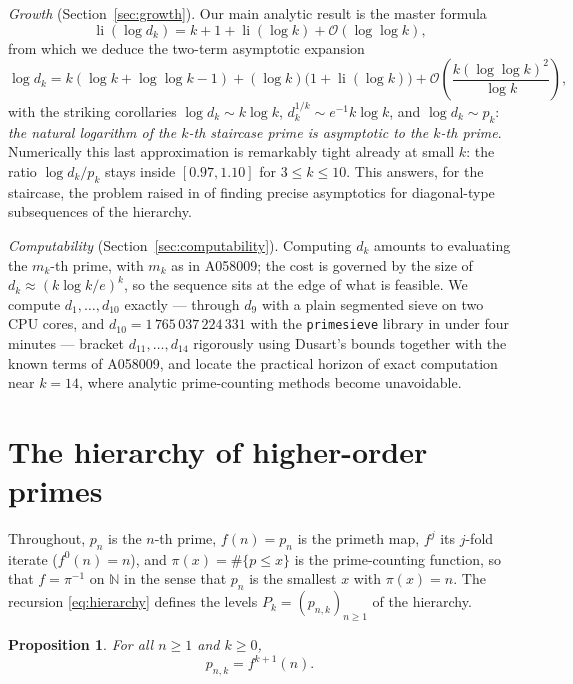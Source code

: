 \documentclass[11pt,a4paper]{article}
\theoremstyle{plain}
\newtheorem{proposition}[theorem]{Proposition}
\theoremstyle{definition}
\newcommand{\N}{\mathbb{N}}
\newcommand{\li}{\operatorname{li}}
\begin{document}
\emph{Growth} (Section~\ref{sec:growth}). Our main analytic result is the
master formula
\[
  \li(\log d_k)=k+1+\li(\log k)+\mathcal{O}(\log\log k),
\]
from which we deduce the two-term asymptotic expansion
\[
  \log d_k=k(\log k+\log\log k-1)+(\log k)\bigl(1+\li(\log k)\bigr)
  +\mathcal{O}\!\left(\frac{k(\log\log k)^2}{\log k}\right),
\]
with the striking corollaries $\log d_k\sim k\log k$,
$d_k^{1/k}\sim e^{-1}k\log k$, and $\log d_k\sim p_k$: \emph{the natural
logarithm of the $k$-th staircase prime is asymptotic to the $k$-th prime}.
Numerically this last approximation is remarkably tight already at small
$k$: the ratio $\log d_k/p_k$ stays inside $[0.97,1.10]$ for $3\le k\le 10$.
This answers, for the staircase, the problem raised in
\cite{MiskaTothZmija} of finding precise asymptotics for diagonal-type
subsequences of the hierarchy.

\emph{Computability} (Section~\ref{sec:computability}). Computing $d_k$
amounts to evaluating the $m_k$-th prime, with $m_k$ as in A058009; the cost
is governed by the size of $d_k\approx(k\log k/e)^{k}$, so the sequence sits
at the edge of what is feasible. We compute $d_1,\dots,d_{10}$ exactly ---
through $d_9$ with a plain segmented sieve on two CPU cores, and
$d_{10}=1\,765\,037\,224\,331$ with the \texttt{primesieve} library
\cite{primesieve} in under four minutes --- bracket $d_{11},\dots,d_{14}$
rigorously using Dusart's bounds \cite{Dusert} together with the known terms
of A058009, and locate the practical horizon of exact computation near
$k=14$, where analytic prime-counting methods become unavoidable.

\section{The hierarchy of higher-order primes}\label{sec:hierarchy}

Throughout, $p_n$ is the $n$-th prime, $f(n)=p_n$ is the primeth map, $f^{j}$
its $j$-fold iterate ($f^{0}(n)=n$), and $\pi(x)=\#\{p\le x\}$ is the
prime-counting function, so that $f=\pi^{-1}$ on $\N$ in the sense that
$p_n$ is the smallest $x$ with $\pi(x)=n$. The recursion
\eqref{eq:hierarchy} defines the levels
$P_k=(p_{n,k})_{n\ge1}$ of the hierarchy.

\begin{proposition}\label{prop:iterates}
For all $n\ge 1$ and $k\ge 0$,
\[
  p_{n,k}=f^{k+1}(n).
\]
\end{proposition}
\end{document}
